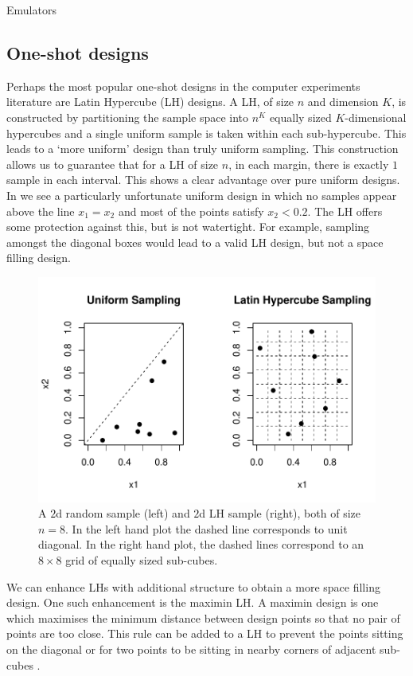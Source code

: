 \begin{chapter}{Emulators \label{Ch:Emulators}}
\subsection{One-shot designs}
Perhaps the most popular one-shot designs in the computer experiments literature are Latin Hypercube (LH) designs. A LH, of size $n$ and dimension $K$, is constructed by partitioning the sample space into $n^K$ equally sized $K$-dimensional hypercubes and a single uniform sample is taken within each sub-hypercube. This leads to a `more uniform' design than truly uniform sampling. This construction allows us to guarantee that for a LH of size $n$, in each margin, there is exactly $1$ sample in each interval. This shows a clear advantage over pure uniform designs. In  we see a particularly unfortunate uniform design in which no samples appear above the line $x_1=x_2$ and most of the points satisfy $x_2 < 0.2$. The LH offers some protection against this, but is not watertight. For example, sampling amongst the diagonal boxes would lead to a valid LH design, but not a space filling design.
\begin{figure}[h]
  \centering
  \includegraphics{fig-emulators/rand-latin.pdf}
  \caption{A $2$d random sample (left) and $2$d LH sample (right), both of size $n = 8$. In the left hand plot the dashed line corresponds to unit diagonal.  In the right hand plot, the dashed lines correspond to an $8 \times 8$ grid of equally sized sub-cubes.}
  \label{Fig:rand-lh}
\end{figure}
We can enhance LHs with additional structure to obtain a more space filling design. One such enhancement is the maximin LH. A maximin design is one which maximises the minimum distance between design points so that no pair of points are too close. This rule can be added to a LH to prevent the points sitting on the diagonal or for two points to be sitting in nearby corners of adjacent sub-cubes \citep{Mckay1979, Morris1995}.

\end{chapter}
